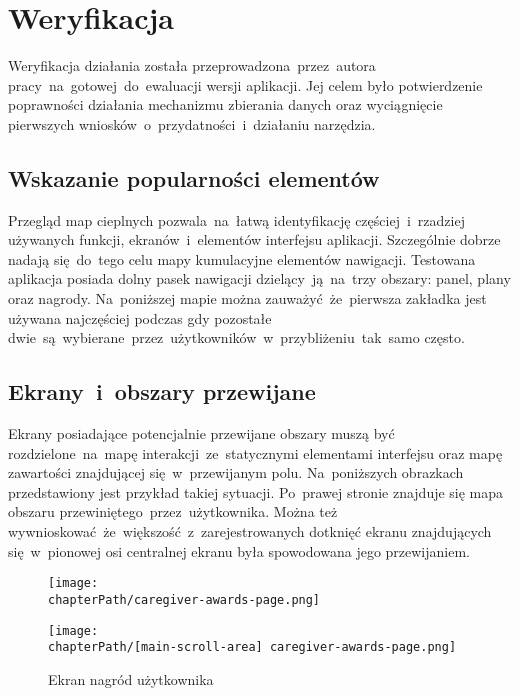 \section{Weryfikacja}
Weryfikacja działania została przeprowadzona~przez~autora pracy~na~gotowej~do~ewaluacji wersji aplikacji. Jej celem było potwierdzenie poprawności działania mechanizmu zbierania danych oraz wyciągnięcie pierwszych wniosków~o~przydatności~i~działaniu narzędzia.

\subsection{Wskazanie popularności elementów}
Przegląd map cieplnych pozwala~na~łatwą identyfikację częściej~i~rzadziej używanych funkcji, ekranów~i~elementów interfejsu aplikacji. Szczególnie dobrze nadają się~do~tego celu mapy kumulacyjne elementów nawigacji. Testowana aplikacja posiada dolny pasek nawigacji dzielący~ją~na~trzy obszary: panel, plany oraz nagrody. Na~poniższej mapie można zauważyć~że~pierwsza zakładka jest używana najczęściej podczas gdy pozostałe dwie~są~wybierane~przez~użytkowników~w~przybliżeniu~tak~samo często.

\bigskip
{}

\subsection{Ekrany~i~obszary przewijane}
Ekrany posiadające potencjalnie przewijane obszary muszą być rozdzielone~na~mapę interakcji~ze~statycznymi elementami interfejsu oraz mapę zawartości znajdującej się~w~przewijanym polu. Na~poniższych obrazkach przedstawiony jest przykład takiej sytuacji. Po~prawej stronie znajduje się mapa obszaru przewiniętego~przez~użytkownika. Można też wywnioskować~że~większość~z~zarejestrowanych dotknięć ekranu znajdujących się~w~pionowej osi centralnej ekranu była spowodowana jego przewijaniem. 

\bigskip
\begin{figure}[H]
\centering
\begin{minipage}{.35\textwidth}
	\centering
	\texttt{[image: \\chapterPath/caregiver-awards-page.png]}
\end{minipage}
\begin{minipage}{.3\textwidth}
	\centering
	\texttt{[image: \\chapterPath/[main-scroll-area] caregiver-awards-page.png]}
\end{minipage}
\bigskip
\caption{Ekran nagród użytkownika}
\label{fig:rs_panel_parts}
\end{figure}

